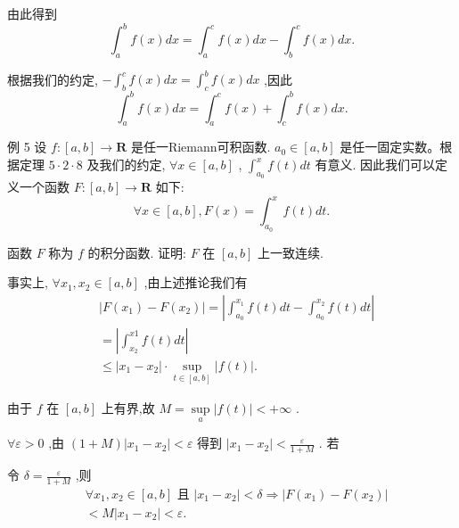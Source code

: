 由此得到
$${\int }_{a}^{b}f\left( x\right) {dx} = {\int }_{a}^{c}f\left( x\right) {dx} - {\int }_{b}^{c}f\left( x\right) {dx}.$$

根据我们的约定, $- {\int }_{b}^{c}f\left( x\right) {dx} = {\int }_{c}^{b}f\left( x\right) {dx}$ ,因此
$${\int }_{a}^{b}f\left( x\right) {dx} = {\int }_{a}^{c}f\left( x\right)  + {\int }_{c}^{b}f\left( x\right) {dx}.$$

例 5 设 $f : \left\lbrack  {a,b}\right\rbrack   \rightarrow  \mathbf{R}$ 是任一Riemann可积函数. ${a}_{0} \in  \left\lbrack  {a,b}\right\rbrack$ 是任一固定实数。根据定理 $5 \cdot  2 \cdot  8$ 及我们的约定, $\forall x \in  \left\lbrack  {a,b}\right\rbrack$ , ${\int }_{{a}_{0}}^{x}f\left( t\right) {dt}$ 有意义. 因此我们可以定义一个函数 $F : \left\lbrack  {a,b}\right\rbrack   \rightarrow  \mathbf{R}$ 如下:
$$\forall x \in  \left\lbrack  {a,b}\right\rbrack  ,F\left( x\right)  = {\int }_{{a}_{0}}^{x}f\left( t\right) {dt}.$$

函数 $F$ 称为 $f$ 的积分函数. 证明: $F$ 在 $\left\lbrack  {a,b}\right\rbrack$ 上一致连续.

事实上, $\forall {x}_{1},{x}_{2} \in  \left\lbrack  {a,b}\right\rbrack$ ,由上述推论我们有
\begin{align*}
	&\left| {F\left( {x}_{1}\right)  - F\left( {x}_{2}\right) }\right|  = \left| {{\int }_{{a}_{0}}^{{x}_{1}}f\left( t\right) {dt} - {\int }_{{a}_{0}}^{{x}_{2}}f\left( t\right) {dt}}\right|\\
	&= \left| {{\int }_{{x}_{2}}^{x1}f\left( t\right) {dt}}\right|\\
	&\leq  \left| {{x}_{1} - {x}_{2}}\right|  \cdot  \mathop{\sup }\limits_{{t \in  \left\lbrack  {a,b}\right\rbrack  }}\left| {f\left( t\right) }\right| .
\end{align*}

由于 $f$ 在 $\left\lbrack  {a,b}\right\rbrack$ 上有界,故 $M = \mathop{\sup }\limits_{a}\left| {f\left( t\right) }\right|  <  + \infty$ .

$\forall \varepsilon  > 0$ ,由 $\left( {1 + M}\right) \left| {{x}_{1} - {x}_{2}}\right|  < \varepsilon$ 得到 $\left| {{x}_{1} - {x}_{2}}\right|  < \frac{\varepsilon }{1 + M}$ . 若

令 $\delta  = \frac{\varepsilon }{1 + M}$ ,则
\begin{align*}
	&\forall {x}_{1},{x}_{2} \in  \left\lbrack  {a,b}\right\rbrack  \text{ 且 }\left| {{x}_{1} - {x}_{2}}\right|  < \delta  \Rightarrow  \left| {F\left( {x}_{1}\right)  - F\left( {x}_{2}\right) }\right|\\
	&< M\left| {{x}_{1} - {x}_{2}}\right|  < \varepsilon .
\end{align*}

